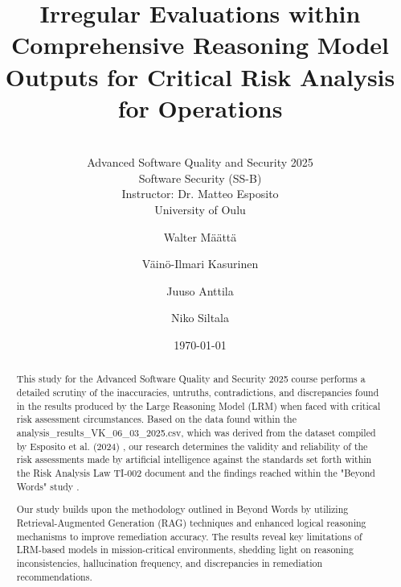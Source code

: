 \documentclass[sigconf]{acmart}
\begin{document}
\title{Irregular Evaluations within Comprehensive Reasoning Model Outputs for Critical Risk Analysis for Operations}
\subtitle{\\[0.5cm] Advanced Software Quality and Security 2025 \\ Software Security (SS-B) \\ Instructor: Dr. Matteo Esposito \\ University of Oulu}

\author{Walter Määttä}

\author{Väinö-Ilmari Kasurinen}

\author{Juuso Anttila}

\author{Niko Siltala}

\date{\today}

\begin{abstract}
  This study for the Advanced Software Quality and Security 2025 course performs a detailed scrutiny of the inaccuracies, untruths, contradictions, and discrepancies found in the results produced by the Large Reasoning Model (LRM) when faced with critical risk assessment circumstances. Based on the data found within the analysis\allowbreak\_results\allowbreak\_VK\allowbreak\_06\allowbreak\_03\allowbreak\_2025.csv, which was derived from the dataset compiled by Esposito et al. (2024) \citep{esposito2024dataset}, our research determines the validity and reliability of the risk assessments made by artificial intelligence against the standards set forth within the Risk Analysis Law TI-002 document and the findings reached within the "Beyond Words" study \citep{esposito2024beyond}.
  
  Our study builds upon the methodology outlined in Beyond Words \citep{esposito2024beyond} by utilizing Retrieval-Augmented Generation (RAG) techniques and enhanced logical reasoning mechanisms to improve remediation accuracy. The results reveal key limitations of LRM-based models in mission-critical environments, shedding light on reasoning inconsistencies, hallucination frequency, and discrepancies in remediation recommendations.
\end{abstract}

\end{document}

